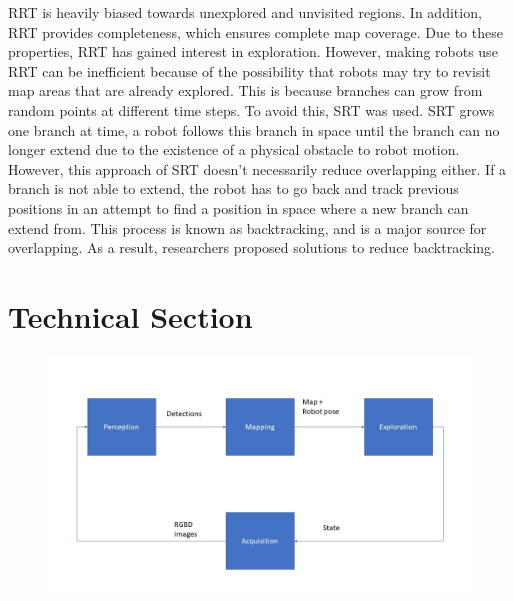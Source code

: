 \documentclass{article}
\begin{document}
	RRT is heavily biased towards unexplored and unvisited regions. In addition, RRT provides completeness, which ensures complete map coverage. Due to these properties, RRT has gained interest in exploration. However, making robots use RRT can be inefficient because of the possibility that robots may try to revisit map areas that are already explored. This is because branches can grow from random points at different time steps. To avoid this, SRT was used. SRT grows one branch at time, a robot follows this branch in space until the branch can no longer extend due to the existence of a physical obstacle to robot motion. However, this approach of SRT doesn't necessarily reduce overlapping either. If a branch is not able to extend, the robot has to go back and track previous positions in an attempt to find a position in space where a new branch can extend from. This process is known as backtracking, and is a major source for overlapping. As a result, researchers proposed solutions to reduce backtracking.
	
	
	\section*{Technical Section}
		 
	 \begin{figure}[htbp]
	 	\centering
	 	\includegraphics[width=\linewidth]{pics/pipeline}
	 \end{figure}
	
%	
%	
	
\end{document}
